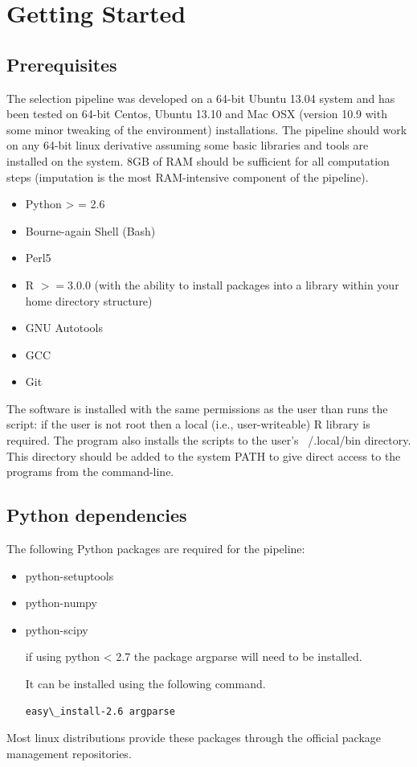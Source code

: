 \documentclass[a4paper,10pt]{article}
\begin{document}
\section{Getting Started}
\subsection{Prerequisites}
The selection pipeline was developed on a 64-bit Ubuntu 13.04 system
and has been tested on 64-bit Centos, Ubuntu 13.10 and Mac OSX (version 10.9 with some minor tweaking of the environment)
installations. The pipeline should work on any 64-bit linux derivative
assuming some basic libraries and tools are installed on the
system. 8GB of RAM should be sufficient for all computation steps
(imputation is the most RAM-intensive component of the pipeline).
\begin{itemize}
\item Python > = 2.6 
\item Bourne-again Shell (Bash)
\item Perl5
\item R \( >= 3.0.0 \) (with the ability to install packages into a
  library within your home directory structure)
\item GNU Autotools
\item GCC 
\item Git
\end{itemize}
The software is installed with the same permissions as the user than
runs the script: if the user is not root then a local (i.e.,
user-writeable) R library is
required. The program also installs the scripts to the user's
~/.local/bin directory.  This directory should be added to the system
PATH to give direct access to the programs from the command-line. 
 
\subsection{Python dependencies}
The following Python packages are required for the pipeline:
\begin{itemize}
\item python-setuptools
\item python-numpy
\item python-scipy

if using python < 2.7 the package argparse will need to be installed.

It can be installed using the following command.

\begin{verbatim}
easy\_install-2.6 argparse
\end{verbatim}
\end{itemize}
Most linux distributions provide these packages through the official
package management repositories.
\end{document}
